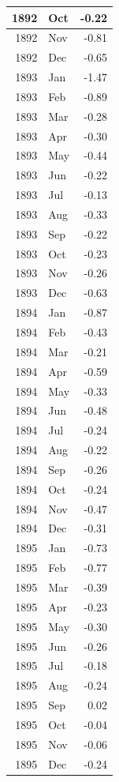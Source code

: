 \documentclass[
]{article}
\begin{document}
\begin{table}[H]
\begin{tabular}[t]{r|l|r}
\hline
1892 & Oct & -0.22\\
\hline
1892 & Nov & -0.81\\
\hline
1892 & Dec & -0.65\\
\hline
1893 & Jan & -1.47\\
\hline
1893 & Feb & -0.89\\
\hline
1893 & Mar & -0.28\\
\hline
1893 & Apr & -0.30\\
\hline
1893 & May & -0.44\\
\hline
1893 & Jun & -0.22\\
\hline
1893 & Jul & -0.13\\
\hline
1893 & Aug & -0.33\\
\hline
1893 & Sep & -0.22\\
\hline
1893 & Oct & -0.23\\
\hline
1893 & Nov & -0.26\\
\hline
1893 & Dec & -0.63\\
\hline
1894 & Jan & -0.87\\
\hline
1894 & Feb & -0.43\\
\hline
1894 & Mar & -0.21\\
\hline
1894 & Apr & -0.59\\
\hline
1894 & May & -0.33\\
\hline
1894 & Jun & -0.48\\
\hline
1894 & Jul & -0.24\\
\hline
1894 & Aug & -0.22\\
\hline
1894 & Sep & -0.26\\
\hline
1894 & Oct & -0.24\\
\hline
1894 & Nov & -0.47\\
\hline
1894 & Dec & -0.31\\
\hline
1895 & Jan & -0.73\\
\hline
1895 & Feb & -0.77\\
\hline
1895 & Mar & -0.39\\
\hline
1895 & Apr & -0.23\\
\hline
1895 & May & -0.30\\
\hline
1895 & Jun & -0.26\\
\hline
1895 & Jul & -0.18\\
\hline
1895 & Aug & -0.24\\
\hline
1895 & Sep & 0.02\\
\hline
1895 & Oct & -0.04\\
\hline
1895 & Nov & -0.06\\
\hline
1895 & Dec & -0.24\\

\end{tabular}
\end{table}
\end{document}
